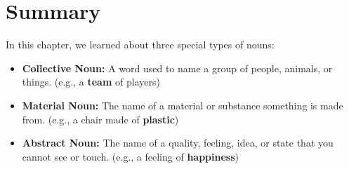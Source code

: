 \section{Summary}
\begin{summarybox}
    In this chapter, we learned about three special types of nouns:
    \begin{itemize}
        \item \textbf{Collective Noun:} A word used to name a group of people, animals, or things. (e.g., a \textbf{team} of players)
        \item \textbf{Material Noun:} The name of a material or substance something is made from. (e.g., a chair made of \textbf{plastic})
        \item \textbf{Abstract Noun:} The name of a quality, feeling, idea, or state that you cannot see or touch. (e.g., a feeling of \textbf{happiness})
    \end{itemize}
\end{summarybox}